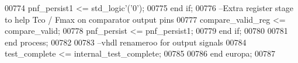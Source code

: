 \begin{DoxyCode}
00774         \textcolor{vhdlchar}{pnf_persist1} \textcolor{vhdlchar}{<=} \textcolor{comment}{std\_logic}\textcolor{vhdlchar}{'}\textcolor{vhdlchar}{(}\textcolor{vhdlchar}{'}\textcolor{vhdllogic}{}\textcolor{vhdllogic}{0}\textcolor{vhdlchar}{'}\textcolor{vhdlchar}{)};
00775       \textcolor{keywordflow}{end} \textcolor{keywordflow}{if};
00776 \textcolor{keyword}{      --Extra register stage to help Tco / Fmax on comparator output pins}
00777       \textcolor{vhdlchar}{compare_valid_reg} \textcolor{vhdlchar}{<=} \textcolor{vhdlchar}{compare_valid};
00778       \textcolor{vhdlchar}{pnf_persist} \textcolor{vhdlchar}{<=} \textcolor{vhdlchar}{pnf_persist1};
00779     \textcolor{keywordflow}{end} \textcolor{keywordflow}{if};
00780 
00781   \textcolor{keywordflow}{end} \textcolor{keywordflow}{process};
00782 
00783 \textcolor{keyword}{  --vhdl renameroo for output signals}
00784   \textcolor{vhdlchar}{test_complete} \textcolor{vhdlchar}{<=} \textcolor{vhdlchar}{internal_test_complete};
00785 
00786 \textcolor{keywordflow}{end} \textcolor{vhdlchar}{europa};
00787 
\end{DoxyCode}
